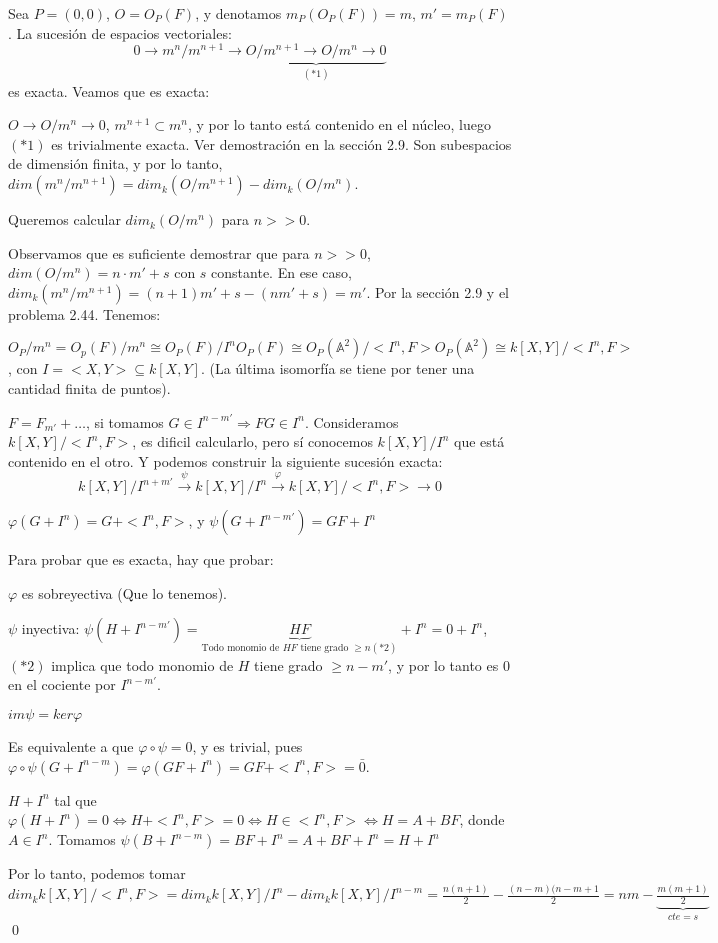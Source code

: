 \begin{Dem}
Sea $P=(0,0)$, $O=O_P(F)$, y denotamos $m_P(O_P(F))=m$, $m'=m_P(F)$. La sucesión de espacios vectoriales:
$$0 \rightarrow m^n/m^{n+1} \rightarrow \underbrace{O/m^{n+1} \rightarrow O/m^{n} \rightarrow 0}_{(*1)} $$
es exacta. Veamos que es exacta:

$O \rightarrow O/m^n \rightarrow 0$, $m^{n+1}\subset m^n$, y por lo tanto está contenido en el núcleo, luego $(*1)$ es trivialmente exacta.  Ver demostración en la sección 2.9. Son subespacios de dimensión finita, y por lo tanto, $dim (m^n/m^{n+1}) = dim_k (O/m^{n+1})-dim_k(O/m^n)$. 

Queremos calcular $dim_k(O/m^n)$ para $n>>0$. 

Observamos que es suficiente demostrar que para $n>>0$, $dim (O/m^n)=n\cdot m'+s$ con $s$ constante. En ese caso, $dim_k(m^n/m^{n+1}) = (n+1)m'+s-(nm'+s)=m'$. Por la sección 2.9 y el problema 2.44. Tenemos:

$O_P/m^n = O_p(F)/m^n \cong O_P(F)/I^n O_P(F) \cong O_P(\mathbb{A}^2)/<I^n,F>O_P(\mathbb{A}^2) \cong k[X,Y]/<I^n,F>$, con $I=<X,Y>\subseteq k[X,Y]$. (La última isomorfía se tiene por tener una cantidad finita de puntos). 

$F=F_{m'}+\dots$, si tomamos $G\in I^{n-m'} \Rightarrow FG\in I^n$.  Consideramos $k[X,Y]/<I^n,F>$, es dificil calcularlo, pero sí conocemos $k[X,Y]/I^n$ que está contenido en el otro. Y podemos construir la siguiente sucesión exacta:
$$ k[X,Y]/I^{n+m'}\xrightarrow{\psi} k[X,Y] /I^n \xrightarrow{\varphi} k[X,Y]/<I^n,F> \rightarrow 0 $$

$\varphi(G+I^n) = G+<I^n,F>$, y $\psi(G+I^{n-m'})= GF+I^n$

Para probar que es exacta, hay que probar:

\begin{itemize*}
\item $\varphi$ es sobreyectiva (Que lo tenemos).
\item $\psi$ inyectiva: $\psi (H+I^{n-m'}) = \underbrace{HF}_{\text{Todo monomio de } HF \text{ tiene grado } \ge n (*2)} +I^n = 0 + I^n$, $(*2)$ implica que todo monomio de $H$ tiene grado $\ge n-m'$, y por lo tanto es $0$ en el cociente por $I^{n-m'}$. 
\item $im \psi = ker \varphi$ 

\framebox{$\subseteq $} Es equivalente a que $\varphi \circ \psi = 0$, y es trivial, pues $\varphi \circ \psi (G+I^{n-m})=\varphi(GF+I^n)=GF+<I^n,F>= \bar{0}$. 

\framebox{$\supseteq $} $H+I^n$ tal que $\varphi(H+I^n)=0 \Leftrightarrow H+<I^n,F>=0 \Leftrightarrow H\in <I^n,F> \Leftrightarrow H= A+BF$, donde $A \in I^n$. Tomamos $\psi(B+I^{n-m}) = BF+I^n=A+BF+I^n=H+I^n$ 
\end{itemize*} 

Por lo tanto, podemos tomar $dim_k k[X,Y]/<I^n,F> = dim_k k[X,Y]/I^n - dim_k k[X,Y]/I^{n-m} = \frac{n(n+1)}{2}-\frac{(n-m)(n-m+1}{2}=nm-\underbrace{\frac{m(m+1)}{2}}_{cte=s}$ \qed
\end{Dem}

